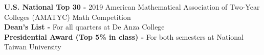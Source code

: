 

\begin{cvparagraph}

\textbf{U.S. National Top 30 - } 2019 American Mathematical Association of Two-Year Colleges (AMATYC) Math Competition     
\\[2pt]
\textbf{Dean's List - } For all quarters at De Anza College 
\\[2pt]
\textbf{Presidential Award (Top 5\% in class) - } For both semesters at National Taiwan University

\end{cvparagraph}
